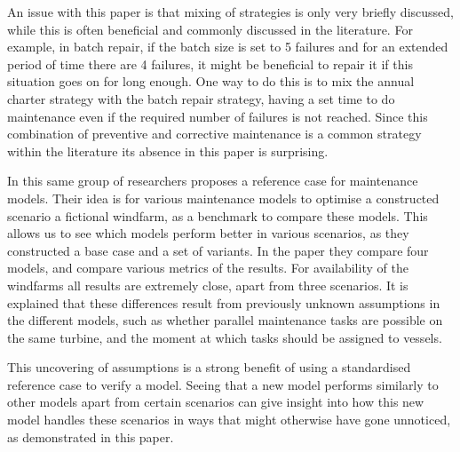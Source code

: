 \documentclass[a4paper,12pt]{article}
\begin{document}
An issue with this paper is that mixing of strategies is only very briefly discussed, while this is often beneficial and commonly discussed in the literature. For example, in batch repair, if the batch size is set to 5 failures and for an extended period of time there are 4 failures, it might be beneficial to repair it if this situation goes on for long enough. One way to do this is to mix the annual charter strategy with the batch repair strategy, having a set time to do maintenance even if the required number of failures is not reached. Since this combination of preventive and corrective maintenance is a common strategy within the literature its absence in this paper is surprising. 

\bigskip

In \cite{dinwoodie2015reference} this same group of researchers proposes a reference case for maintenance models. Their idea is for various maintenance models to optimise a constructed scenario a fictional windfarm, as a benchmark to compare these models. This allows us to see which models perform better in various scenarios, as they constructed a base case and a set of variants. In the paper they compare four models, and compare various metrics of the results. For availability of the windfarms all results are extremely close, apart from three scenarios. It is explained that these differences result from previously unknown assumptions in the different models, such as whether  parallel maintenance tasks are possible on the same turbine, and the moment at which tasks should be assigned to vessels. 

This uncovering of assumptions is a strong benefit of using a standardised reference case to verify a model. Seeing that a new model performs similarly to other models apart from certain scenarios can give insight into how this new model handles these scenarios in ways that might otherwise have gone unnoticed, as demonstrated in this paper. 

\end{document}
